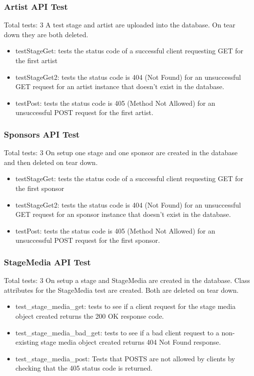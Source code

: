 \documentclass[12pt,english]{scrartcl}
\begin{document}
\subsubsection{Artist API Test} 
Total tests: 3
A test stage and artist are uploaded into the database. On tear down they are both deleted.
\begin{itemize}
 \item testStageGet: tests the status code of a successful client requesting GET for the first artist
 
 \item testStageGet2: tests the status code is 404 (Not Found) for an unsuccessful GET request for an artist instance
 that doesn't exist in the database.
 
 \item testPost: tests the status code is 405 (Method Not Allowed) for an unsuccessful POST request for the first artist.
\end{itemize}

\subsubsection{Sponsors API Test} 
Total tests: 3
On setup one stage and one sponsor are created in the database and then deleted on tear down.
\begin{itemize}
 \item testStageGet: tests the status code of a successful client requesting GET for the first sponsor
 
 \item testStageGet2: tests the status code is 404 (Not Found) for an unsuccessful GET request for an sponsor instance
 that doesn't exist in the database.
 
 \item testPost: tests the status code is 405 (Method Not Allowed) for an unsuccessful POST request for the first sponsor.
\end{itemize}

\subsubsection{StageMedia API Test} 
Total tests: 3
On setup a stage and StageMedia are created in the database. Class attributes for the StageMedia test are created.
Both are deleted on tear down.
\begin{itemize}
 \item test\_stage\_media\_get: tests to see if a client request for the stage media object created returns the 200 OK response code.
 
 \item test\_stage\_media\_bad\_get: tests to see if a bad client request to a non-existing stage media object created returns 
                                     404 Not Found response.
 
 \item test\_stage\_media\_post: Tests that POSTS are not allowed by clients by checking that the 405 status code is returned.
\end{itemize}
\end{document}

